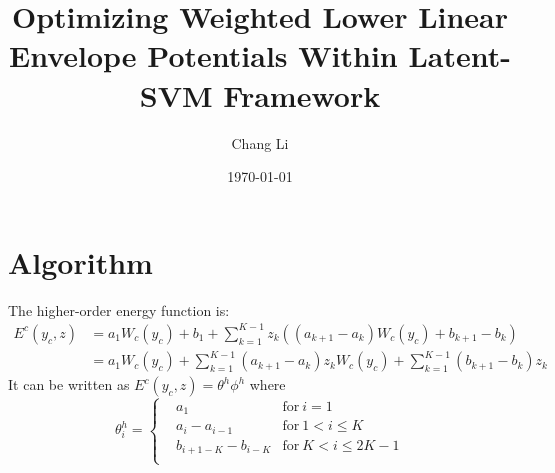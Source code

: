 \documentclass{article}
\title{Optimizing Weighted Lower Linear Envelope Potentials Within Latent-SVM Framework}
\author{Chang Li}
\date{\today}
\begin{document}
	\maketitle
	\section{Algorithm}
	The higher-order energy function is:
	\begin{align*}
		E^c(y_c,z)&=a_1W_c(y_c)+b_1+\sum_{k=1}^{K-1}z_k((a_{k+1}-a_k)W_c(y_c)+b_{k+1}-b_k)\\
					&=a_1W_c(y_c)+\sum_{k=1}^{K-1}(a_{k+1}-a_k)z_kW_c(y_c)+\sum_{k=1}^{K-1}(b_{k+1}-b_k)z_k
	\end{align*}
	It can be written as $ E^c(y_c,z) = \theta^h\phi^h$ where
				\begin{equation}
				\label{param:hightheta}
					\theta^h_i = \left\{
					\begin{aligned}
						& a_1	& \text{for} \ i=1\\
						& a_i-a_{i-1} & \text{for}\ 1< i \leq K\\
						& b_{i+1-K}-b_{i-K} & \text{for} \ K<i\le2K-1\\
					\end{aligned}
					\right.
				\end{equation}
				
\end{document}
